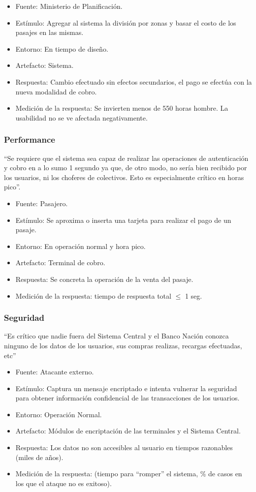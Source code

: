 \documentclass[]{article}
\begin{document}
\begin{itemize}
	\item Fuente: Ministerio de Planificación.
	\item Estímulo: Agregar al sistema la división por zonas y basar el costo de los pasajes en las mismas.
	\item Entorno: En tiempo de diseño.
	\item Artefacto: Sistema.
	\item Respuesta: Cambio efectuado sin efectos secundarios, el pago se efectúa con la nueva modalidad de cobro.
	\item Medición de la respuesta: Se invierten menos de 550 horas hombre. La usabilidad no se ve afectada negativamente.
\end{itemize}


\subsubsection{Performance}
``Se requiere que el sistema sea capaz de realizar las operaciones de autenticación y cobro en a lo sumo 1 segundo ya que, de otro modo, no sería bien recibido por los usuarios, ni los choferes de colectivos. Esto es especialmente crítico en horas pico''.
\begin{itemize}
	\item Fuente: Pasajero.
	\item Estímulo: Se aproxima o inserta una tarjeta para realizar el pago de un pasaje.
	\item Entorno: En operación normal y hora pico.
	\item Artefacto: Terminal de cobro.
	\item Respuesta: Se concreta la operación de la venta del pasaje.
	\item Medición de la respuesta: tiempo de respuesta total $\leq$ 1 seg.
\end{itemize}

\subsubsection{Seguridad}
``Es crítico que nadie fuera del Sistema Central y el Banco Nación conozca ninguno de los datos de los usuarios, sus compras realizas, recargas efectuadas, etc''
\begin{itemize}
	\item Fuente: Atacante externo.
	\item Estímulo: Captura un mensaje encriptado e intenta vulnerar la seguridad para obtener información confidencial de las transacciones de los usuarios.
	\item Entorno: Operación Normal.
	\item Artefacto: Módulos de encriptación de las terminales y el Sistema Central.
	\item Respuesta: Los datos no son accesibles al usuario en tiempos razonables (miles de años).
	\item Medición de la respuesta: (tiempo para ``romper'' el sistema, \% de casos en los que el ataque no es exitoso).
\end{itemize}
\end{document}
